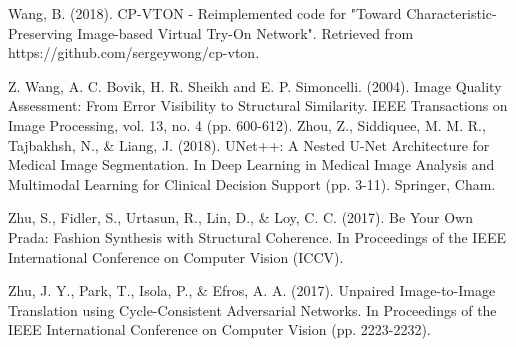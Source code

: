 \documentclass[11pt]{article}
\begin{document}
\begin{thebibliography}{34}
Wang, B. (2018). CP-VTON
 - Reimplemented code for "Toward Characteristic-Preserving Image-based Virtual Try-On Network". Retrieved from https://github.com/sergeywong/cp-vton.

 Z. Wang, A. C. Bovik, H. R. Sheikh and E. P. Simoncelli. (2004). Image Quality Assessment: From Error Visibility to Structural Similarity. IEEE Transactions on Image Processing, vol. 13, no. 4 (pp. 600-612).
Zhou, Z., Siddiquee, M. M. R., Tajbakhsh, N., \& Liang, J. (2018). UNet++: A Nested U-Net Architecture for Medical Image Segmentation. In Deep Learning in Medical Image Analysis and Multimodal Learning for Clinical Decision Support (pp. 3-11). Springer, Cham.

Zhu, S., Fidler, S., Urtasun, R., Lin, D.,  \& Loy, C. C. (2017). Be Your Own Prada: Fashion Synthesis with Structural Coherence. In Proceedings of the IEEE International Conference on Computer Vision (ICCV).

Zhu, J. Y., Park, T., Isola, P., \& Efros, A. A. (2017). Unpaired Image-to-Image Translation using Cycle-Consistent Adversarial Networks. In Proceedings of the IEEE International Conference on Computer Vision (pp. 2223-2232).



\end{thebibliography}
\end{document}
